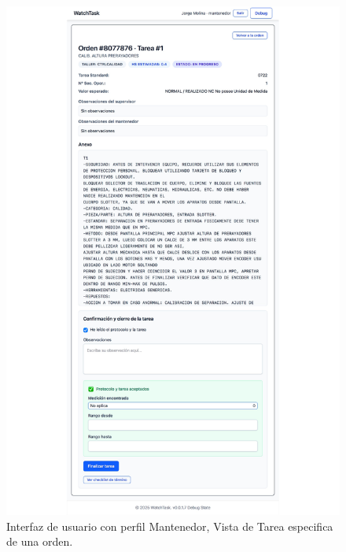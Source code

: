\documentclass[12pt,a4paper]{report}
\begin{document}
\begin{figure}[h]
    \centering
    \includegraphics[width=1\textwidth]{data/Mantenedor_Task.png}
    \caption[\,Mantenedor: Vista de Tarea]{Interfaz de usuario con perfil Mantenedor, Vista de Tarea especifica de una orden.}
    \label{fig:[Mantenedor_Task]}
\end{figure}
\end{document}
